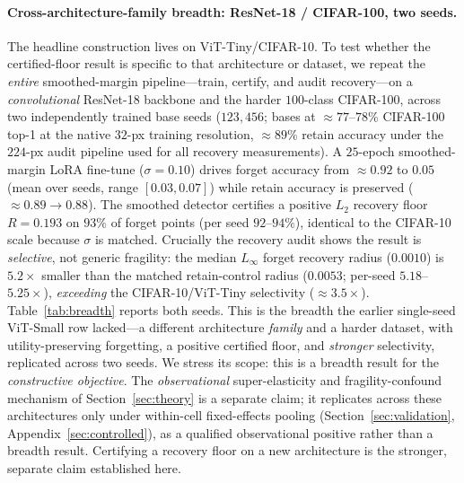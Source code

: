 \documentclass{article}
\begin{document}
\paragraph{Cross-architecture-family breadth: ResNet-18 / CIFAR-100, two seeds.}
The headline construction lives on ViT-Tiny/CIFAR-10. To test whether the
certified-floor result is specific to that architecture or dataset, we repeat the
\emph{entire} smoothed-margin pipeline---train, certify, and audit recovery---on a
\emph{convolutional} ResNet-18 backbone and the harder $100$-class CIFAR-100,
across two independently trained base seeds ($123,456$; bases at
$\approx\!77$--$78\%$ CIFAR-100 top-1 at the native $32$-px training resolution,
$\approx\!89\%$ retain accuracy under the $224$-px audit pipeline used for all
recovery measurements). A $25$-epoch smoothed-margin LoRA fine-tune
($\sigma=0.10$) drives forget accuracy from $\approx\!0.92$ to $0.05$ (mean over
seeds, range $[0.03,0.07]$) while retain accuracy is preserved
($\approx\!0.89\!\to\!0.88$). The smoothed detector certifies a positive $L_2$
recovery floor $R=0.193$ on $93\%$ of forget points (per seed $92$--$94\%$),
identical to the CIFAR-10 scale because $\sigma$ is matched. Crucially the
recovery audit shows the result is \emph{selective}, not generic fragility: the
median $L_\infty$ forget recovery radius ($0.0010$) is $5.2\times$ smaller than
the matched retain-control radius ($0.0053$; per-seed $5.18$--$5.25\times$),
\emph{exceeding} the CIFAR-10/ViT-Tiny selectivity ($\approx\!3.5\times$).
Table~\ref{tab:breadth} reports both seeds. This is the breadth the earlier
single-seed ViT-Small row lacked---a different architecture \emph{family} and a
harder dataset, with utility-preserving forgetting, a positive certified floor,
and \emph{stronger} selectivity, replicated across two seeds. We stress its
scope: this is a breadth result for the \emph{constructive objective}. The
\emph{observational} super-elasticity and fragility-confound mechanism of
Section~\ref{sec:theory} is a separate claim; it replicates across these
architectures only under within-cell fixed-effects pooling
(Section~\ref{sec:validation}, Appendix~\ref{sec:controlled}), as a qualified
observational positive rather than a breadth result. Certifying a recovery floor
on a new architecture is the stronger, separate claim established here.
\end{document}

